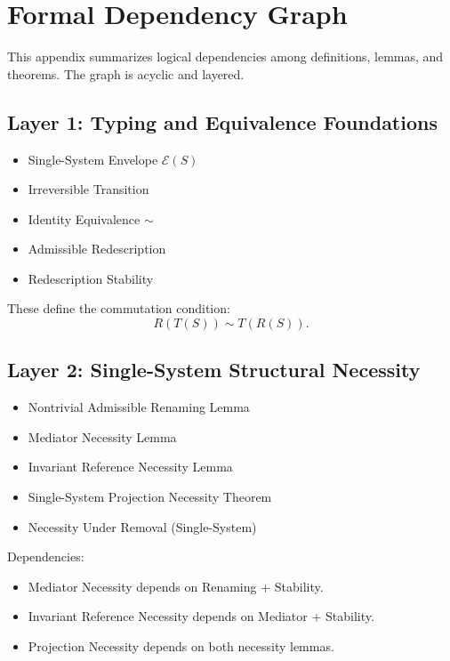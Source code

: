 \documentclass[11pt]{article}
\theoremstyle{definition}
\begin{document}
\appendix
\section{Formal Dependency Graph}

This appendix summarizes logical dependencies among definitions, lemmas, and theorems.
The graph is acyclic and layered.

\subsection*{Layer 1: Typing and Equivalence Foundations}

\begin{itemize}
    \item Single-System Envelope $\mathcal{E}(S)$
    \item Irreversible Transition
    \item Identity Equivalence $\sim$
    \item Admissible Redescription
    \item Redescription Stability
\end{itemize}

These define the commutation condition:
\[
R(T(S)) \sim T(R(S)).
\]

\subsection*{Layer 2: Single-System Structural Necessity}

\begin{itemize}
    \item Nontrivial Admissible Renaming Lemma
    \item Mediator Necessity Lemma
    \item Invariant Reference Necessity Lemma
    \item Single-System Projection Necessity Theorem
    \item Necessity Under Removal (Single-System)
\end{itemize}

Dependencies:
\begin{itemize}
    \item Mediator Necessity depends on Renaming + Stability.
    \item Invariant Reference Necessity depends on Mediator + Stability.
    \item Projection Necessity depends on both necessity lemmas.
\end{itemize}
\end{document}
